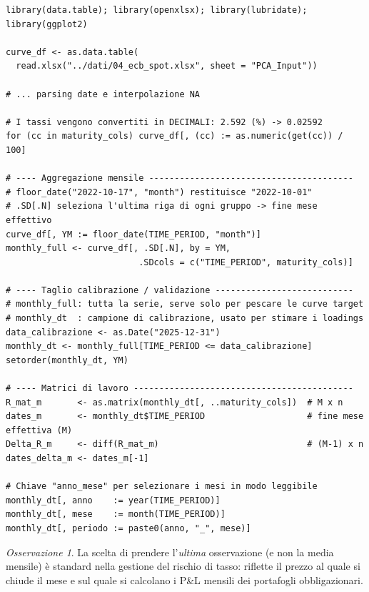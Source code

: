 \documentclass[11pt,a4paper]{article}
\theoremstyle{plain}
\theoremstyle{definition}
\theoremstyle{remark}
\newtheorem*{osservazione}{Osservazione}
\begin{document}
\begin{codebox}
\begin{Verbatim}[fontsize=\small]
library(data.table); library(openxlsx); library(lubridate); library(ggplot2)

curve_df <- as.data.table(
  read.xlsx("../dati/04_ecb_spot.xlsx", sheet = "PCA_Input"))

# ... parsing date e interpolazione NA

# I tassi vengono convertiti in DECIMALI: 2.592 (%) -> 0.02592
for (cc in maturity_cols) curve_df[, (cc) := as.numeric(get(cc)) / 100]

# ---- Aggregazione mensile ----------------------------------------
# floor_date("2022-10-17", "month") restituisce "2022-10-01"
# .SD[.N] seleziona l'ultima riga di ogni gruppo -> fine mese effettivo
curve_df[, YM := floor_date(TIME_PERIOD, "month")]
monthly_full <- curve_df[, .SD[.N], by = YM,
                          .SDcols = c("TIME_PERIOD", maturity_cols)]

# ---- Taglio calibrazione / validazione ---------------------------
# monthly_full: tutta la serie, serve solo per pescare le curve target
# monthly_dt  : campione di calibrazione, usato per stimare i loadings
data_calibrazione <- as.Date("2025-12-31")
monthly_dt <- monthly_full[TIME_PERIOD <= data_calibrazione]
setorder(monthly_dt, YM)

# ---- Matrici di lavoro -------------------------------------------
R_mat_m       <- as.matrix(monthly_dt[, ..maturity_cols])  # M x n
dates_m       <- monthly_dt$TIME_PERIOD                    # fine mese effettiva (M)
Delta_R_m     <- diff(R_mat_m)                             # (M-1) x n
dates_delta_m <- dates_m[-1]

# Chiave "anno_mese" per selezionare i mesi in modo leggibile
monthly_dt[, anno    := year(TIME_PERIOD)]
monthly_dt[, mese    := month(TIME_PERIOD)]
monthly_dt[, periodo := paste0(anno, "_", mese)]
\end{Verbatim}
\end{codebox}

\begin{osservazione}
La scelta di prendere l'\emph{ultima} osservazione (e non la media mensile) è
standard nella gestione del rischio di tasso: riflette il prezzo al quale si
chiude il mese e sul quale si calcolano i P\&L mensili dei portafogli obbligazionari.
\end{osservazione}
\end{document}
